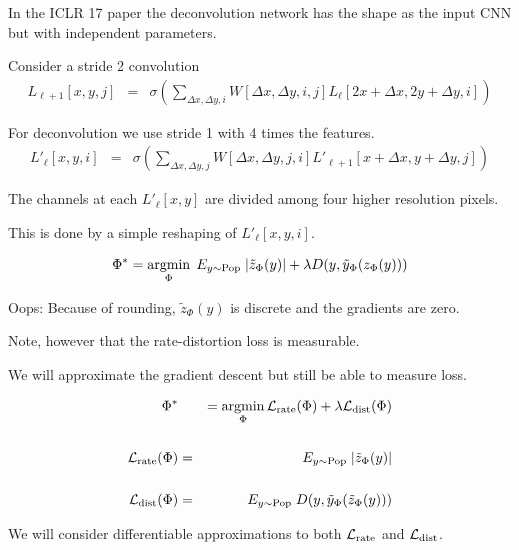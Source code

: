 {\vfill
In the ICLR 17 paper the deconvolution network has the shape as the input CNN but with independent parameters.


Consider a stride 2 convolution
\begin{eqnarray*}
  L_{\ell+1}[x,y,j] & = & \sigma\left(\sum_{\Delta x,\Delta y,i}   W[\Delta x, \Delta y, i,j] L_\ell[2x + \Delta x, 2y + \Delta y, i]\right)
\end{eqnarray*}

\vfill
For deconvolution we use stride 1 with 4 times the features.
\begin{eqnarray*}
  L'_\ell[x,y,i] & = & \sigma\left(\sum_{\Delta x,\Delta y,j}   W[\Delta x, \Delta y, j,i] L'_{\ell+1}[x + \Delta x, y + \Delta y, j]\right)
\end{eqnarray*}

\vfill
The channels at each $L'_\ell[x,y]$ are divided among four higher resolution pixels.

\vfill
This is done by a simple reshaping of $L'_\ell[x,y,i]$.


$$\Phi^* = \operatorname*{argmin}_\Phi \;E_{y \sim \mathrm{Pop}}\;|\tilde{z}_\Phi(y)| + \lambda D(y,\tilde{y}_\Phi(z_\Phi(y)))$$

\vfill
Oops: Because of rounding, $\tilde{z}_\Phi(y)$ is discrete and the gradients are zero.

\vfill
Note, however that the rate-distortion loss is measurable.

\vfill
We will approximate the gradient descent but still be able to measure loss.


\begin{eqnarray*}
\Phi^* & & = \operatorname*{argmin}_\Phi {\cal L}_{\mathrm{rate}}(\Phi) + \lambda {\cal L}_{\mathrm{dist}} (\Phi) \\
\\
{\cal L}_{\mathrm{rate}}(\Phi) & = & E_{y \sim \mathrm{Pop}}\;|\tilde{z}_\Phi(y)| \\
\\
{\cal L}_{\mathrm{dist}}(\Phi) & = & E_{y \sim \mathrm{Pop}} \;D(y,\tilde{y}_\Phi(\tilde{z}_\Phi(y)))
\end{eqnarray*}

\vfill
We will consider differentiable approximations to both ${\cal L}_{\mathrm{rate}}$ and ${\cal L}_{\mathrm{dist}}$.

}

